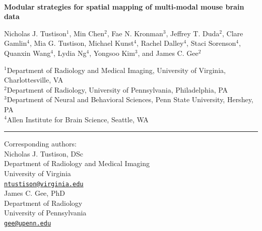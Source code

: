 \documentclass[
  12pt,
]{article}
\author{}
\date{\vspace{-2.5em}}
\begin{document}
\linenumbers
{}


\begin{centering}

$ $

\vspace{6cm}

\LARGE

{\bf Modular strategies for spatial mapping of multi-modal mouse brain data}

\vspace{1.0 cm}

\normalsize

Nicholas J. Tustison$^{1}$,
Min Chen$^{2}$,
Fae N. Kronman$^{3}$,
Jeffrey T. Duda$^{2}$,
Clare Gamlin$^{4}$,
Mia G. Tustison,
Michael Kunst$^{4}$,
Rachel Dalley$^{4}$,
Staci Sorenson$^{4}$,
Quanxin Wang$^{4}$,
Lydia Ng$^{4}$,
Yongsoo Kim$^{3}$, and
James C. Gee$^{2}$

\small

$^{1}$Department of Radiology and Medical Imaging, University of Virginia, Charlottesville, VA \\
$^{2}$Department of Radiology, University of Pennsylvania, Philadelphia, PA \\
$^{3}$Department of Neural and Behavioral Sciences, Penn State University, Hershey, PA \\
$^{4}$Allen Institute for Brain Science, Seattle, WA \\

\end{centering}

\vspace{3.5 cm}

\noindent

\rule{4cm}{0.4pt}

\scriptsize

Corresponding authors:\\

Nicholas J. Tustison, DSc\\
Department of Radiology and Medical Imaging\\
University of Virginia\\
\href{mailto:ntustison@virginia.edu}{\nolinkurl{ntustison@virginia.edu}}\\

James C. Gee, PhD\\
Department of Radiology\\
University of Pennsylvania\\
\href{mailto:gee@upenn.edu}{\nolinkurl{gee@upenn.edu}}
\end{document}
